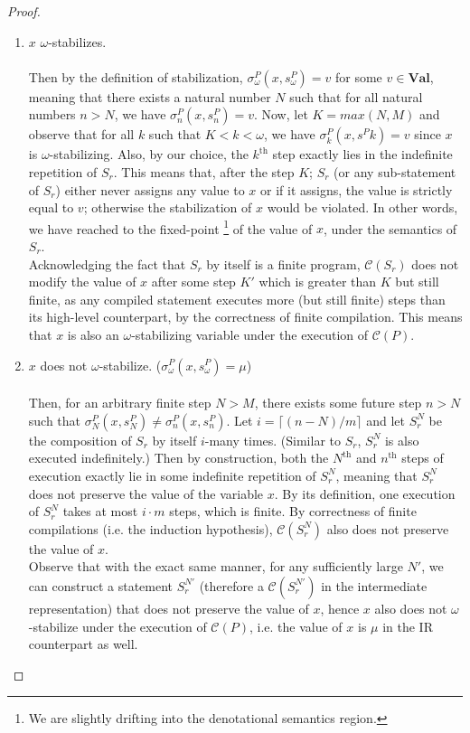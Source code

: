 \documentclass{article}
\begin{document}
\begin{proof}
\begin{itemize}
        \begin{enumerate}
            \item $x$ $\omega$-stabilizes. \\\\
            Then by the definition of stabilization, $\sigma^P_\omega(x, s^P_\omega) = v$ for some $v \in \textbf{Val}$, meaning that there exists a natural number $N$ such that for all natural numbers $n > N$, we have $\sigma^P_n(x, s^P_n) = v$. Now, let $K = \textit{max}(N, M)$ and observe that for all $k$ such that $K < k < \omega$, we have $\sigma^P_k(x, s^Pk) = v$ since $x$ is $\omega$-stabilizing. Also, by our choice, the $k^\text{th}$ step exactly lies in the indefinite repetition of $S_r$. This means that, after the step $K$; $S_r$ (or any sub-statement of $S_r$) either never assigns any value to $x$ or if it assigns, the value is strictly equal to $v$; otherwise the stabilization of $x$ would be violated. In other words, we have reached to the fixed-point \footnote{We are slightly drifting into the denotational semantics region.} of the value of $x$, under the semantics of $S_r$. \\
            Acknowledging the fact that $S_r$ by itself is a finite program, $\mathcal{C}(S_r)$ does not modify the value of $x$ after some step $K'$ which is greater than $K$ but still finite, as any compiled statement executes more (but still finite) steps than its high-level counterpart, by the correctness of finite compilation. This means that $x$ is also an $\omega$-stabilizing variable under the execution of $\mathcal{C}(P)$.

            \vspace{2em}
            
            \item $x$ does not $\omega$-stabilize. ($\sigma^P_\omega(x, s^P_\omega) = \mu$) \\\\
            Then, for an arbitrary finite step $N > M$, there exists some future step $n > N$ such that $\sigma^P_N(x, s^P_N) \neq \sigma^P_n(x, s^P_n)$. Let $i = \lceil (n- N)/m \rceil$ and let $S^N_r$ be the composition of $S_r$ by itself $i$-many times. (Similar to $S_r$, $S^N_r$ is also executed indefinitely.) Then by construction, both the $N^\text{th}$ and $n^\text{th}$ steps of execution exactly lie in some indefinite repetition of $S^N_r$, meaning that $S^N_r$ does not preserve the value of the variable $x$. By its definition, one execution of $S^N_r$ takes at most $i\cdot m$ steps, which is finite. By correctness of finite compilations (i.e. the induction hypothesis), $\mathcal{C}(S^N_r)$ also does not preserve the value of $x$. \\
            Observe that with the exact same manner, for any sufficiently large $N'$, we can    construct a statement $S^{N'}_r$ (therefore a $\mathcal{C}(S^{N'}_r)$ in the intermediate representation)  that does not preserve the value of $x$, hence $x$ also does not $\omega$-stabilize under the execution of $\mathcal{C}(P)$, i.e. the value of $x$ is $\mu$ in the IR counterpart as well.      
        \end{enumerate}


\end{itemize}
\end{proof}
\end{document}
